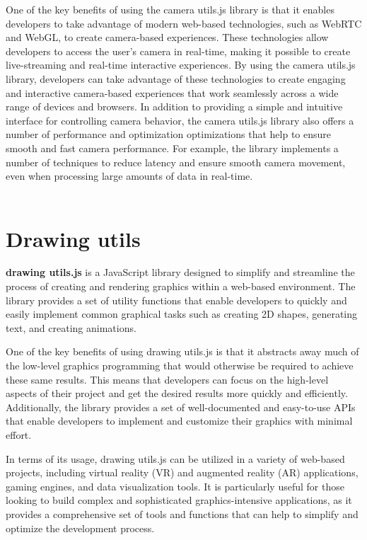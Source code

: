 One of the key benefits of using the camera utils.js library is that it enables developers to take advantage of 
modern web-based technologies, such as WebRTC and WebGL, to create camera-based experiences. These technologies 
allow developers to access the user's camera in real-time, making it possible to create live-streaming and 
real-time interactive experiences. By using the camera utils.js library, developers can take advantage of these 
technologies to create engaging and interactive camera-based experiences that work seamlessly across a wide range of devices and browsers.
In addition to providing a simple and intuitive interface for controlling camera behavior, the camera utils.js 
library also offers a number of performance and optimization optimizations that help to ensure smooth and fast 
camera performance. For example, the library implements a number of techniques to reduce latency and ensure 
smooth camera movement, even when processing large amounts of data in real-time.
\\
\\
\section{Drawing utils}
\textbf{drawing utils.js} is a JavaScript library designed to simplify and streamline the process of 
creating and rendering graphics within a web-based environment. The library provides a set of utility 
functions that enable developers to quickly and easily implement common graphical tasks such as 
creating 2D shapes, generating text, and creating animations.

One of the key benefits of using drawing utils.js is that it abstracts away much of the 
low-level graphics programming that would otherwise be required to achieve these same results. 
This means that developers can focus on the high-level aspects of their project and get the 
desired results more quickly and efficiently. Additionally, the library provides a set of 
well-documented and easy-to-use APIs that enable developers to implement and customize 
their graphics with minimal effort.

In terms of its usage, drawing utils.js can be utilized in a variety of web-based projects, 
including virtual reality (VR) and augmented reality (AR) applications, gaming engines, 
and data visualization tools. It is particularly useful for those looking to build complex 
and sophisticated graphics-intensive applications, as it provides a comprehensive set of 
tools and functions that can help to simplify and optimize the development process.

